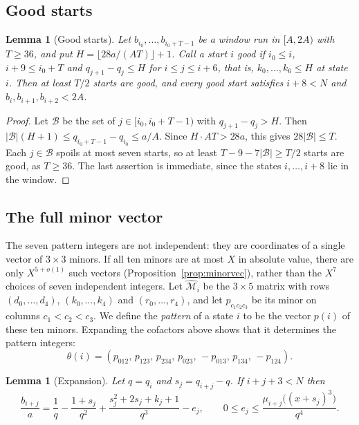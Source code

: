 \documentclass[11pt]{article}
\newtheorem{lemma}[theorem]{Lemma}
\theoremstyle{definition}
\theoremstyle{remark}
\begin{document}
\subsection{Good starts}\label{sec:goodstarts}

\begin{lemma}[Good starts]\label{lem:good}
Let $b_{i_0},\dots,b_{i_0+T-1}$ be a window run in $[A,2A)$ with $T\ge36$, and put
$H=\lfloor 28a/(AT)\rfloor+1$. Call a start $i$ \emph{good} if $i_0\le i$, $i+9\le i_0+T$ and
$q_{j+1}-q_j\le H$ for $i\le j\le i+6$, that is, $k_0,\dots,k_6\le H$ at state $i$. Then at least
$T/2$ starts are good, and every good start satisfies $i+8<N$ and $b_i,b_{i+1},b_{i+2}<2A$.
\end{lemma}

\begin{proof}
Let $\mathcal B$ be the set of $j\in[i_0,i_0+T-1)$ with $q_{j+1}-q_j>H$. Then
$|\mathcal B|(H+1)\le q_{i_0+T-1}-q_{i_0}\le a/A$. Since $H\cdot AT>28a$, this gives
$28|\mathcal B|\le T$. Each $j\in\mathcal B$ spoils at most seven starts, so at least
$T-9-7|\mathcal B|\ge T/2$ starts are good, as $T\ge36$. The last assertion is immediate,
since the states $i,\dots,i+8$ lie in the window.
\end{proof}

\subsection{The full minor vector}\label{sec:minors}
The seven pattern integers are not independent: they are coordinates of a single vector of
$3\times3$ minors. If all ten minors are at most $X$ in absolute value, there are only
$X^{5+o(1)}$ such vectors (Proposition~\ref{prop:minorvec}), rather than the $X^7$ choices of seven
independent integers.
Let $\widehat{\mathcal M}_i$ be the $3\times5$ matrix with rows $(d_0,\dots,d_4)$, $(k_0,\dots,k_4)$
and $(r_0,\dots,r_4)$, and let $p_{c_1c_2c_3}$ be its minor on columns $c_1<c_2<c_3$. We define
the \emph{pattern} of a state $i$ to be the vector $p(i)$ of these ten minors. Expanding
the cofactors above shows that it determines the pattern integers:
\[
\theta(i)=(p_{012},\,p_{123},\,p_{234},\,p_{023},\,-p_{013},\,p_{134},\,-p_{124}).
\]

\begin{lemma}[Expansion]\label{lem:expand}
Let $q=q_i$ and $s_j=q_{i+j}-q$. If $i+j+3<N$ then
\[
\frac{b_{i+j}}a=\frac1q-\frac{1+s_j}{q^2}+\frac{s_j^2+2s_j+k_j+1}{q^3}-e_j,\qquad
0\le e_j\le\frac{\mu_{i+j}\bigl((x+s_j)^3\bigr)}{q^4}.
\]
\end{lemma}
\end{document}
